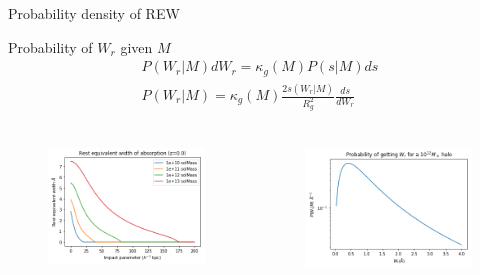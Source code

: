 \documentclass{beamer}
\begin{document}
\begin{frame}[allowframebreaks]{Probability density of REW}
\begin{block}{Probability of $W_r$ given $M$}
\begin{equation}
{\begin{aligned}
			P(W_r|M)dW_r=\kappa_g(M)P(s|M)ds\\
			P(W_r|M)=\kappa_g(M)\frac{2s(W_r|M)}{R_g^2}\frac{ds}{dW_r}\\
			\end{aligned}
		}
		\end{equation}
		\end{block}
		\begin{columns}
			\begin{column}{0.5\textwidth}
				\begin{figure}
					\includegraphics[width=\textwidth]{Rew_kpc.png}
				\end{figure}
			\end{column}
			\begin{column}{0.5\textwidth}
				\begin{figure}
					\includegraphics[width=\textwidth]{p_rew_given_m.png}
				\end{figure}
			\end{column}
		\end{columns}
		\end{frame}
\end{document}
